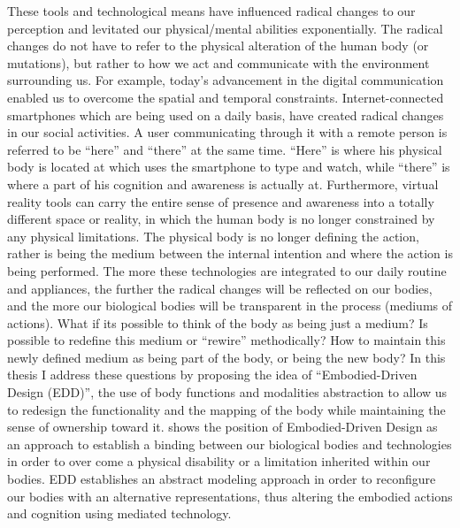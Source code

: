 These tools and technological means have influenced radical changes to our perception and levitated our physical/mental abilities exponentially. The radical changes do not have to refer to the physical alteration of the human body (or mutations), but rather to how we act and communicate with the environment surrounding us. For example, today's advancement in the digital communication enabled us to overcome the spatial and temporal constraints. Internet-connected smartphones which are being used on a daily basis, have created radical changes in our social activities. A user communicating through it with a remote person is referred to be ``here'' and ``there'' at the same time. ``Here'' is where his physical body is located at which uses the smartphone to type and watch, while ``there'' is where a part of his cognition and awareness is actually at. Furthermore, virtual reality tools can carry the entire sense of presence and awareness into a totally different space or reality, in which the human body is no longer constrained by any physical limitations. The physical body is no longer defining the action, rather is being the medium between the internal intention and where the action is being performed. The more these technologies are integrated to our daily routine and appliances, the further the radical changes will be reflected on our bodies, and the more our biological bodies will be transparent in the process (mediums of actions). What if its possible to think of the body as being just a medium? Is possible to redefine this medium or ``rewire'' methodically? How to maintain this newly defined medium as being part of the body, or being the new body? In this thesis I address these questions by proposing the idea of ``Embodied-Driven Design (EDD)'', the use of body functions and modalities abstraction to allow us to redesign the functionality and the mapping of the body while maintaining the sense of ownership toward it.   shows the position of Embodied-Driven Design as an approach to establish a binding between our biological bodies and technologies in order to over come a physical disability or a limitation inherited within our bodies. EDD establishes an abstract modeling approach in order to reconfigure our bodies with an alternative representations, thus altering the embodied actions and cognition using mediated technology.


